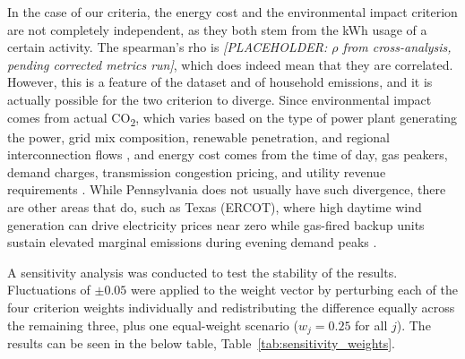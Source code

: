\documentclass[final,3p,times]{elsarticle}
\begin{document}
In the case of our criteria, the energy cost and the environmental impact criterion are not completely independent, as they both stem from the kWh usage of a certain activity. The spearman's rho is \textit{[PLACEHOLDER: $\rho$ from cross-analysis, pending corrected metrics run]}, which does indeed mean that they are correlated. However, this is a feature of the dataset and of household emissions, and it is actually possible for the two criterion to diverge. Since environmental impact comes from actual CO\textsubscript{2}, which varies based on the type of power plant generating the power, grid mix composition, renewable penetration, and regional interconnection flows \cite{pjm2022emissions}, and energy cost comes from the time of day, gas peakers, demand charges, transmission congestion pricing, and utility revenue requirements \cite{peco2021}. While Pennsylvania does not usually have such divergence, there are other areas that do, such as Texas (ERCOT), where high daytime wind generation can drive electricity prices near zero while gas-fired backup units sustain elevated marginal emissions during evening demand peaks \cite{ercot2019,holland2016}.

A sensitivity analysis was conducted to test the stability of the results. Fluctuations of $\pm 0.05$ were applied to the weight vector by perturbing each of the four criterion weights individually and redistributing the difference equally across the remaining three, plus one equal-weight scenario ($w_j = 0.25$ for all $j$). The results can be seen in the below table, Table~\ref{tab:sensitivity_weights}.
\end{document}
